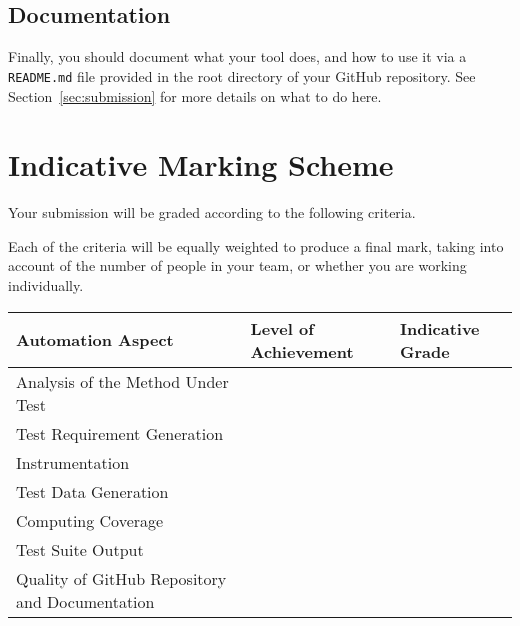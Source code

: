 
\subsection{Documentation}

Finally, you should document what your tool does, and how to use it via a {\tt
README.md} file provided in the root directory of your GitHub repository. See
Section~\ref{sec:submission} for more details on what to do here.


\section{Indicative Marking Scheme}

Your submission will be graded according to the following criteria. 

Each of the criteria will be equally weighted to produce a final mark,  taking
into account of the number of people in your team, or whether you are working
individually. 

\begin{tabular}{p{10em}p{15em}p{5em}}

    \toprule

    {\bf Automation Aspect} & {\bf Level of Achievement} & {\bf Indicative Grade} \\

    \midrule

    Analysis of the Method Under Test \\

    \midrule

    Test Requirement Generation \\

    \midrule

    Instrumentation \\

    \midrule

    Test Data Generation \\

    \midrule

    Computing Coverage \\

    \midrule

    Test Suite Output \\

    \midrule

    Quality of GitHub Repository and Documentation \\

    \bottomrule

\end{tabular}

